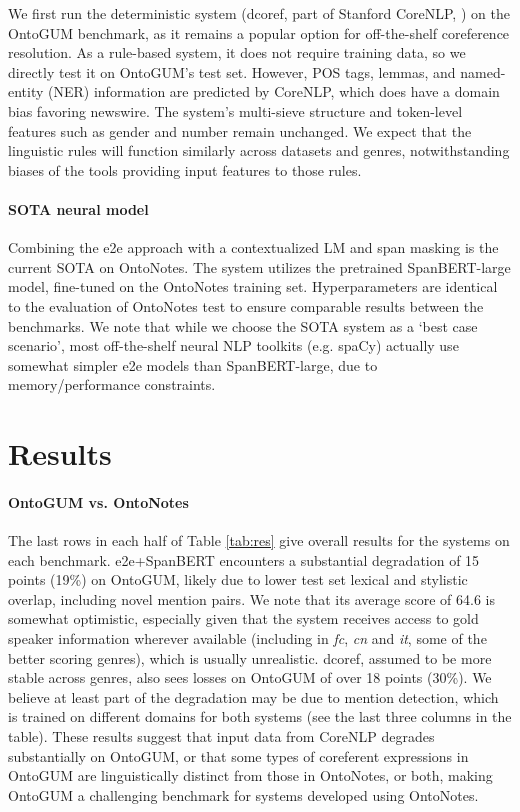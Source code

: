 \documentclass[11pt,a4paper]{article}
\begin{document}
We first run the deterministic system (dcoref, part of Stanford CoreNLP, \citealt{manning-EtAl:2014:P14-5})
on the OntoGUM benchmark, as it remains a popular option for off-the-shelf coreference resolution. As a rule-based system, it does not require training data, so we directly test it on OntoGUM's test set. However, POS tags, lemmas, and named-entity (NER) information are predicted by CoreNLP, which does have a domain bias favoring newswire. The system's multi-sieve structure and token-level features such as gender and number remain unchanged. We expect that the linguistic rules will function similarly across datasets and genres, notwithstanding biases of the tools providing input features to those rules.


\paragraph{SOTA neural model} Combining the e2e approach with a contextualized LM and span masking is the current SOTA on OntoNotes. The system
utilizes the pretrained SpanBERT-large model, fine-tuned on the OntoNotes training set. Hyperparameters are identical to the evaluation of OntoNotes test to ensure comparable results between the benchmarks. We note that while we choose the SOTA system as a `best case scenario', most off-the-shelf neural NLP toolkits (e.g. spaCy) actually use somewhat simpler e2e models than SpanBERT-large, due to memory/performance constraints.



\section{Results}


\paragraph{OntoGUM vs. OntoNotes} The last rows in each half of Table \ref{tab:res} give overall results for the systems on each benchmark. e2e+SpanBERT encounters a substantial degradation of 15 points (19\%) on OntoGUM, likely due to lower test set lexical and stylistic overlap, including novel mention pairs. We note that its average score of 64.6 is somewhat optimistic, especially given that the system receives access to gold speaker information wherever available (including in \textit{fc}, \textit{cn} and \textit{it}, some of the better scoring genres), which is usually unrealistic. dcoref, assumed to be more stable across genres, also sees losses on OntoGUM of over 18 points (30\%). We believe at least part of the degradation may be due to mention detection, which is trained on different domains for both systems (see the last three columns in the table). These results suggest that input data from CoreNLP degrades substantially on OntoGUM, or that some types of coreferent expressions in OntoGUM are linguistically distinct from those in OntoNotes, or both, making OntoGUM a challenging benchmark for systems developed using OntoNotes. 
\end{document}
